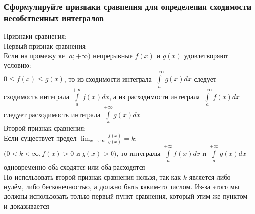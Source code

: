 \documentclass{article}
\begin{document}
\subsubsection{Сформулируйте признаки сравнения для определения сходимости несобственных интегралов}
Признаки сравнения:\\
Первый признак сравнения:\\
Если на промежутке $ [a; +\infty) $ непрерывные $ f(x) $ и $ g(x) $ удовлетворяют условию:\\
$ 0 \le f(x) \le g(x) $, то из сходимости интеграла $ \int\limits^{+\infty}_{a} g(x)dx $ следует сходимость интеграла $ \int\limits^{+\infty}_{a} f(x)dx $, а из расходимости интеграла $ \int\limits^{+\infty}_{a} f(x)dx $ следует расходимость интеграла $ \int\limits^{+\infty}_{a} g(x)dx $\\
Второй признак сравнения:\\
Если существует предел $ \lim_{x\to \infty} \frac{f(x)}{g(x)} = k $:\\
$ (0 < k < \infty, f(x) > 0 $ и $ g(x) > 0) $, то интегралы $ \int\limits^{+\infty}_{a} f(x)dx $ и $ \int\limits^{+\infty}_{a} g(x)dx $ одновременно оба сходятся или оба расходятся\\
Но использовать второй признак сравнения нельзя, так как $ k $ является либо нулём, либо бесконечностью, а должно быть каким-то числом. Из-за этого мы должны использовать только первый пункт сравнения, который этим же пунктом и доказывается
\end{document}

